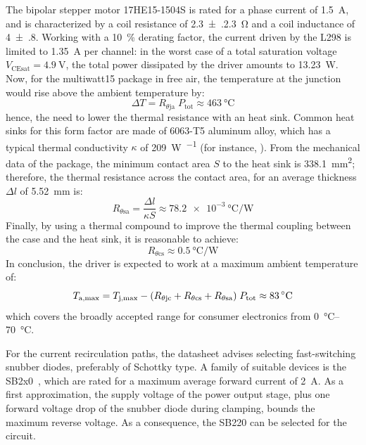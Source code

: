 The bipolar stepper motor 17HE15-1504S is rated for a phase current of \qty{1.5}{\A}, and is characterized by a coil resistance of \qty{2.3(.23)}{\ohm} and a coil inductance of \qty{4(.8)}{\mH}. Working with a \qty{10}{\percent} derating factor, the current driven by the L298 is limited to \qty{1.35}{\A} per channel: in the worst case of a total saturation voltage $V_\text{CEsat} = \qty{4.9}{\V}$, the total power dissipated by the driver amounts to \qty{13.23}{\W}.
Now, for the multiwatt15 package in free air, the temperature at the junction would rise above the ambient temperature by:
\[
    \Delta T = R_{\theta\text{ja}}\;P_\text{tot} \approx \qty{463}{\celsius}
\]
hence, the need to lower the thermal resistance with an heat sink. Common heat sinks for this form factor are made of 6063-T5 aluminum alloy, which has a typical thermal conductivity $\kappa$ of \qty{209}{\W\per{\m\kelvin}} (for instance, \cite{xsd_hs}). From the mechanical data of the package, the minimum contact area $S$ to the heat sink is \qty{338.1}{\milli\meter\squared}; therefore, the thermal resistance across the contact area, for an average thickness $\Delta l$ of \qty{5.52}{\milli\m} is:
\[
    R_{\theta\text{sa}} = \frac{\Delta l}{\kappa S} \approx \qty{78.2e-3}{\celsius\per\W}
\]
Finally, by using a thermal compound to improve the thermal coupling between the case and the heat sink, it is reasonable to achieve:
\[
    R_{\theta\text{cs}} \approx \qty{0.5}{\celsius\per\W}
\]
In conclusion, the driver is expected to work at a maximum ambient temperature of:
\[
    T_{\text{a,max}} = T_{\text{j,max}} 
        - \pqty*{R_{\theta\text{jc}}+R_{\theta\text{cs}}+R_{\theta\text{sa}}}
        \;P_\text{tot} \approx \qty{83}{\celsius}
\]
which covers the broadly accepted range for consumer electronics from \qtyrange{0}{70}{\celsius}.

For the current recirculation paths, the datasheet advises selecting fast-switching snubber diodes, preferably of Schottky type. A family of suitable devices is the SB2x0~\cite{sb260}, which are rated for a maximum average forward current of \qty{2}{\A}. As a first approximation, the supply voltage of the power output stage, plus one forward voltage drop of the snubber diode during clamping, bounds the maximum reverse voltage. As a consequence, the SB220 can be selected for the circuit.

